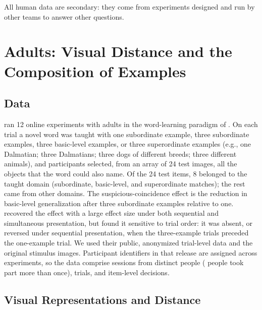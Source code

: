 \documentclass[11pt]{article}
\begin{document}
All human data are secondary: they come from experiments designed and run by other teams to answer other questions.

\section{Adults: Visual Distance and the Composition of Examples}
\label{sec:adults}

\subsection{Data}

\textcite{lewis2018} ran 12 online experiments with adults in the word-learning paradigm of \textcite{xu2007}. On each trial a novel word was taught with one subordinate example, three subordinate examples, three basic-level examples, or three superordinate examples (e.g., one Dalmatian; three Dalmatians; three dogs of different breeds; three different animals), and participants selected, from an array of 24 test images, all the objects that the word could also name. Of the 24 test items, 8 belonged to the taught domain (subordinate, basic-level, and superordinate matches); the rest came from other domains. The suspicious-coincidence effect is the reduction in basic-level generalization after three subordinate examples relative to one. \textcite{lewis2018} recovered the effect with a large effect size under both sequential and simultaneous presentation, but found it sensitive to trial order: it was absent, or reversed under sequential presentation, when the three-example trials preceded the one-example trial. We used their public, anonymized trial-level data and the original stimulus images. Participant identifiers in that release are assigned across experiments, so the data comprise \HFourSessions{} sessions from \HFourPersons{} distinct people (\HFourRepeaters{} people took part more than once), \HFourTrials{} trials, and \HFourNobs{} item-level decisions.

\subsection{Visual Representations and Distance}
\end{document}
